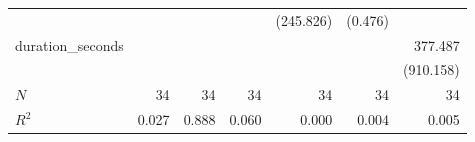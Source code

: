 \begin{tabular}{lrrrrrr}
                  &                                    &                                 &                                    &                       (245.826) &                            (0.476) &                                 \\ 
duration\_seconds &                                    &                                 &                                    &                                 &                                    &                         377.487 \\ 
                  &                                    &                                 &                                    &                                 &                                    &                       (910.158) \\ 
\midrule
$N$               &                                 34 &                              34 &                                 34 &                              34 &                                 34 &                              34 \\ 
$R^2$             &                              0.027 &                           0.888 &                              0.060 &                           0.000 &                              0.004 &                           0.005 \\ 
\bottomrule
\end{tabular}
